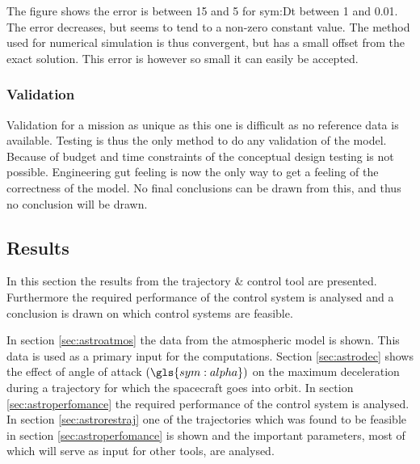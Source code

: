 
The figure shows the error is between 15 and 5 for \gls{sym:Dt} between 1 and 0.01. The error decreases, but seems to tend to a non-zero constant value. The method used for numerical simulation is thus convergent, but has a small offset from the exact solution. This error is however so small it can easily be accepted.

\subsubsection{Validation}
\label{sec:astroval}

Validation for a mission as unique as this one is difficult as no reference data is available. Testing is thus the only method to do any validation of the model. Because of budget and time constraints of the conceptual design testing is not possible. Engineering gut feeling is now the only way to get a feeling of the correctness of the model. No final conclusions can be drawn from this, and thus no conclusion will be drawn.

\subsection{Results}
\label{sec:astrores}
In this section the results from the trajectory \& control tool are presented. Furthermore the required performance of the control system is analysed and a conclusion is drawn on which control systems are feasible.

In section \ref{sec:astroatmos} the data from the atmospheric model is shown. This data is used as a primary input for the computations. Section \ref{sec:astrodec} shows the effect of angle of attack $\left(\gls{sym:alpha}\right)$ on the maximum deceleration during a trajectory for which the spacecraft goes into orbit. In section \ref{sec:astroperfomance} the required performance of the control system is analysed. In section \ref{sec:astrorestraj} one of the trajectories which was found to be feasible in section \ref{sec:astroperfomance} is shown and the important parameters, most of which will serve as input for other tools, are analysed.

